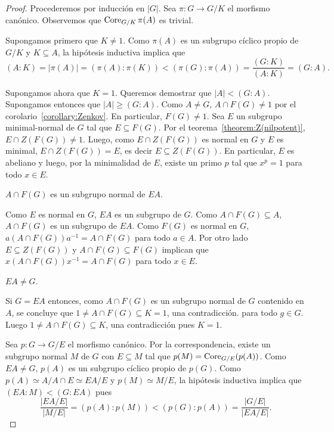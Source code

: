 \begin{proof}
	Procederemos por inducción en $|G|$. Sea $\pi\colon G\to G/K$ el morfismo
	canónico. Observemos que $\operatorname{Core}_{G/K}\pi(A)$ es trivial. 

	Supongamos primero que $K\ne 1$. Como $\pi(A)$ es un subgrupo cíclico propio de
	$G/K$ y $K\subseteq A$, la hipótesis inductiva implica que 
	\[
		(A:K)=|\pi(A)|=(\pi(A):\pi(K))<(\pi(G):\pi(A))=\frac{(G:K)}{(A:K)}=(G:A).
	\]

	Supongamos ahora que $K=1$. Queremos demostrar que $|A|<(G:A)$. Supongamos
	entonces que $|A|\geq (G:A)$. Como $A\ne G$, $A\cap F(G)\ne1$ por el
	corolario~\ref{corollary:Zenkov}. En particular, $F(G)\ne 1$. Sea $E$ un
	subgrupo minimal-normal de $G$ tal que $E\subseteq F(G)$. Por el
	teorema~\ref{theorem:Z(nilpotent)}, $E\cap Z(F(G))\ne 1$.  Luego, como
	$E\cap Z(F(G))$ es normal en $G$ y $E$ es minimal, $E\cap Z(F(G))=E$, es
	decir $E\subseteq Z(F(G))$. En particular, $E$ es abeliano y luego, por la
	minimalidad de $E$, existe un primo $p$ tal que $x^p=1$ para todo $x\in E$. 

	\begin{claim}
		$A\cap F(G)$ es un subgrupo normal de $EA$.
	\end{claim}

	Como $E$ es normal en $G$, $EA$ es un subgrupo de $G$. Como $A\cap
	F(G)\subseteq A$, $A\cap F(G)$ es un subgrupo de $EA$.  Como $F(G)$ es
	normal en $G$, $a(A\cap F(G))a^{-1}=A\cap F(G)$ para todo $a\in A$. Por
	otro lado $E\subseteq Z(F(G))$ y $A\cap F(G)\subseteq F(G)$ implican que
	$x(A\cap F(G))x^{-1}=A\cap F(G)$ para todo $x\in E$. 

	\begin{claim}
		$EA\ne G$.
	\end{claim}

	Si $G=EA$ entonces, como $A\cap F(G)$ es un subgrupo normal de $G$
	contenido en $A$, se concluye que $1\ne A\cap F(G)\subseteq K=1$, una
	contradicción.
	para todo $g\in G$. Luego $1\ne A\cap F(G)\subseteq K$, una contradicción pues $K=1$.

	\medskip
	Sea $p\colon G\to G/E$ el morfismo canónico. Por la correspondencia, existe
	un subgrupo normal $M$ de $G$ con $E\subseteq M$ tal que
	$p(M)=\operatorname{Core}_{G/E}(p(A))$. Como $EA\ne G$, $p(A)$ es un subgrupo cíclico
	propio de $p(G)$. Como $p(A)\simeq A/A\cap E\simeq EA/E$ y $p(M)\simeq
	M/E$, la hipótesis inductiva implica que 
	$(EA:M)<(G:EA)$ pues 
	\[
	\frac{|EA/E|}{|M/E|}
	=(p(A):p(M))
	<(p(G):p(A))
	=\frac{|G/E|}{|EA/E|}.
	\]


\end{proof}
